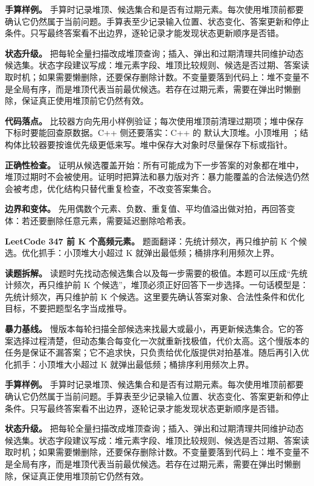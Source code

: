 \textbf{手算样例。} 手算时记录堆顶、候选集合和是否有过期元素。每次使用堆顶前都要确认它仍然属于当前问题。手算表至少记录输入位置、状态变化、答案更新和停止条件。只写最终答案看不出边界，逐轮记录才能发现状态更新顺序是否错。

\textbf{状态升级。} 把每轮全量扫描改成堆顶查询；插入、弹出和过期清理共同维护动态候选集。状态字段建议写成：堆元素字段、堆顶比较规则、候选是否过期、答案读取时机；如果需要懒删除，还要保存删除计数。不变量要落到代码上：堆不变量不是全局有序，而是堆顶代表当前最优候选。若存在过期元素，需要在弹出时懒删除，保证真正使用堆顶前它仍然有效。

\textbf{代码落点。} 比较器方向先用小样例验证；每次使用堆顶前清理过期项；堆中保存下标时要能回查原数据。C++ 侧还要落实：C++ 的  默认大顶堆。小顶堆用 ；结构体比较器要按谁优先级更低来写。堆中保存大对象时尽量保存下标或指针。

\textbf{正确性检查。} 证明从候选覆盖开始：所有可能成为下一步答案的对象都在堆中，堆顶过期时不会被使用。证明时把算法和暴力版对齐：暴力能覆盖的合法候选仍然会被考虑，优化结构只替代重复检查，不改变答案集合。

\textbf{边界和变体。} 先用偶数个元素、负数、重复值、平均值溢出做对拍，再回答变体：若还要删除任意元素，需要延迟删除哈希表。

\noindent\textbf{LeetCode 347 前 K 个高频元素。} 题面翻译：先统计频次，再只维护前 K 个候选。优化抓手：小顶堆大小超过 K 就弹出最低频；桶排序利用频次上界。

\textbf{读题拆解。} 读题时先找动态候选集合以及每一步需要的极值。本题可以压成“先统计频次，再只维护前 K 个候选”，堆顶必须正好回答下一步选择。一句话模型是：先统计频次，再只维护前 K 个候选。这里要先确认答案对象、合法性条件和优化目标，不要把题型名字当成推导。

\textbf{暴力基线。} 慢版本每轮扫描全部候选来找最大或最小，再更新候选集合。它的答案选择过程清楚，但动态集合每变化一次就重新找极值，代价太高。这个慢版本的任务是保证不漏答案；它不追求快，只负责给优化版提供对拍基准。随后再引入优化抓手：小顶堆大小超过 K 就弹出最低频；桶排序利用频次上界。

\textbf{手算样例。} 手算时记录堆顶、候选集合和是否有过期元素。每次使用堆顶前都要确认它仍然属于当前问题。手算表至少记录输入位置、状态变化、答案更新和停止条件。只写最终答案看不出边界，逐轮记录才能发现状态更新顺序是否错。

\textbf{状态升级。} 把每轮全量扫描改成堆顶查询；插入、弹出和过期清理共同维护动态候选集。状态字段建议写成：堆元素字段、堆顶比较规则、候选是否过期、答案读取时机；如果需要懒删除，还要保存删除计数。不变量要落到代码上：堆不变量不是全局有序，而是堆顶代表当前最优候选。若存在过期元素，需要在弹出时懒删除，保证真正使用堆顶前它仍然有效。

